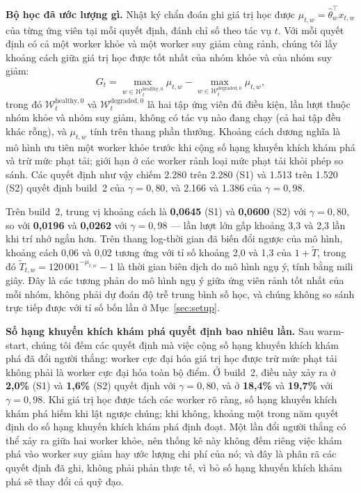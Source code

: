 \documentclass[final,5p,times,twocolumn]{elsarticle}
\begin{document}
\textbf{Bộ học đã ước lượng gì.} Nhật ký chẩn đoán ghi giá trị học được $\mu_{t,w}=\hat\theta_w^\top x_{t,w}$ của từng ứng viên tại mỗi quyết định, đánh chỉ số theo tác vụ $t$. Với mỗi quyết định có cả một worker khỏe và một worker suy giảm cùng rảnh, chúng tôi lấy khoảng cách giữa giá trị học được tốt nhất của nhóm khỏe và của nhóm suy giảm:
\begin{equation}
G_t=\max_{w\in\mathcal{W}_t^{\text{healthy},0}}\mu_{t,w}-\max_{w\in\mathcal{W}_t^{\text{degraded},0}}\mu_{t,w},
\end{equation}
trong đó $\mathcal{W}_t^{\text{healthy},0}$ và $\mathcal{W}_t^{\text{degraded},0}$ là hai tập ứng viên đủ điều kiện, lần lượt thuộc nhóm khỏe và nhóm suy giảm, không có tác vụ nào đang chạy (cả hai tập đều khác rỗng), và $\mu_{t,w}$ tính trên thang phần thưởng. Khoảng cách dương nghĩa là mô hình ưu tiên một worker khỏe trước khi cộng số hạng khuyến khích khám phá và trừ mức phạt tải; giới hạn ở các worker rảnh loại mức phạt tải khỏi phép so sánh. Các quyết định như vậy chiếm 2.280 trên 2.280 (S1) và 1.513 trên 1.520 (S2) quyết định build~2 của $\gamma=0{,}80$, và 2.166 và 1.386 của $\gamma=0{,}98$.

Trên build~2, trung vị khoảng cách là \textbf{0,0645} (S1) và \textbf{0,0600} (S2) với $\gamma=0{,}80$, so với \textbf{0,0196} và \textbf{0,0262} với $\gamma=0{,}98$ --- lần lượt lớn gấp khoảng 3,3 và 2,3 lần khi trí nhớ ngắn hơn. Trên thang log-thời gian đã biến đổi ngược của mô hình, khoảng cách 0,06 và 0,02 tương ứng với tỉ số khoảng 2,0 và 1,3 của $1+\widetilde{T}$, trong đó $\widetilde{T}_{t,w}=120\,001^{-\mu_{t,w}}-1$ là thời gian biên dịch do mô hình ngụ ý, tính bằng mili giây. Đây là các tương phản do mô hình ngụ ý giữa ứng viên rảnh tốt nhất của mỗi nhóm, không phải dự đoán độ trễ trung bình số học, và chúng không so sánh trực tiếp được với tỉ số bốn lần ở Mục~\ref{sec:setup}.

\textbf{Số hạng khuyến khích khám phá quyết định bao nhiêu lần.} Sau warm-start, chúng tôi đếm các quyết định mà việc cộng số hạng khuyến khích khám phá đã đổi người thắng: worker cực đại hóa giá trị học được trừ mức phạt tải không phải là worker cực đại hóa toàn bộ điểm. Ở build~2, điều này xảy ra ở \textbf{2,0\%} (S1) và \textbf{1,6\%} (S2) quyết định với $\gamma=0{,}80$, và ở \textbf{18,4\%} và \textbf{19,7\%} với $\gamma=0{,}98$. Khi giá trị học được tách các worker rõ ràng, số hạng khuyến khích khám phá hiếm khi lật ngược chúng; khi không, khoảng một trong năm quyết định do số hạng khuyến khích khám phá định đoạt. Một lần đổi người thắng có thể xảy ra giữa hai worker khỏe, nên thống kê này không đếm riêng việc khám phá vào worker suy giảm hay ước lượng chi phí của nó; và đây là phân rã các quyết định đã ghi, không phải phản thực tế, vì bỏ số hạng khuyến khích khám phá sẽ thay đổi cả quỹ đạo.
\end{document}
